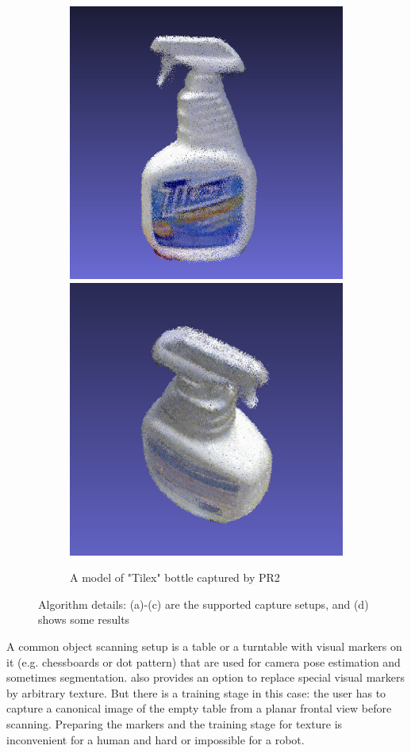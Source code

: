 \documentclass[letterpaper, 10 pt, conference]{ieeeconf}  %
\begin{document}
\begin{figure}[t]
        \begin{subfigure}[b]{\linewidth}
                \centering
                \includegraphics[width=0.49\linewidth]{../tizer/tilexFrontal.png}
                \includegraphics[width=0.49\linewidth]{../tizer/tilexTop.png}
                \caption{A model of "Tilex" bottle captured by PR2}
        \end{subfigure}
        \caption{Algorithm details: (a)-(c) are the supported 
        capture setups, and (d) shows some results}
        \label{fig:tizer}
\end{figure}


A common object scanning setup is a table or a turntable with
visual markers on it (e.g. chessboards or dot pattern) that
are used for camera pose estimation and sometimes segmentation.
\cite{ectoObjectRecognitionCapture} also 
provides an option to replace special visual markers by arbitrary texture.
But there is a training stage in this case:
the user has to capture a canonical image of the empty table from
a planar frontal view before scanning. Preparing the markers
and the training stage for texture is inconvenient for a human and
hard or impossible for a robot. 
\end{document}
